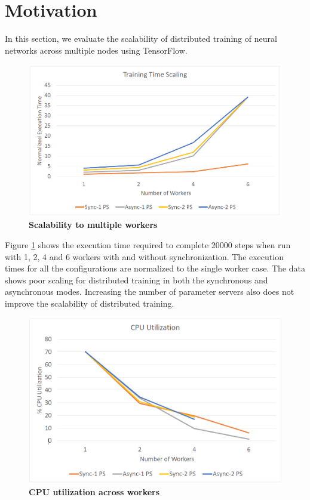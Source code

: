 \section{Motivation} \label{sec:motivation}

In this section, we evaluate the scalability of distributed training of neural networks across multiple nodes using TensorFlow.

\begin{figure}[h]
\centering
  \includegraphics[keepaspectratio,width=\columnwidth]{figures/scaling_train_time.PNG}
  \caption{\textbf{Scalability to multiple workers}}
  \label{fig:scalability}
\end{figure}

Figure \ref{fig:scalability} shows the execution time required 
to complete 20000 steps when run with 1, 2, 4 and 6 workers with
and without synchronization. The 
execution times for all the configurations are normalized to 
the single worker case. The data shows poor scaling for distributed
training in both the synchronous and asynchronous modes. Increasing
the number of parameter servers also does not improve the scalability
of distributed training.

\begin{figure}[h]
\centering
  \includegraphics[keepaspectratio,width=\columnwidth]{figures/cpu_util.PNG}
  \caption{\textbf{CPU utilization across workers}}
  \label{fig:cpuutil}
\end{figure}

